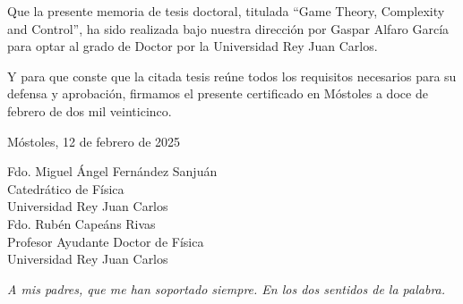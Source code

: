 \documentclass[a4paper,12pt,nofootinbib]{newsiambook}
\newcommand{\clearemptydoublepage}{\newpage{\pagestyle{empty}\cleardoublepage}}
\newcommand{\dedica}{\sffamily \slshape}
\begin{document}
Que la presente memoria de tesis doctoral, titulada “Game Theory, Complexity and Control”, ha sido realizada bajo nuestra dirección por Gaspar Alfaro García para optar al grado de Doctor por la Universidad Rey Juan Carlos. 

Y para que conste que la citada tesis reúne todos los requisitos necesarios para su defensa y aprobación, firmamos el presente certificado en Móstoles a doce de febrero de dos mil veinticinco.

\vspace*{1cm}

\raggedleft
Móstoles, 12 de febrero de 2025

\centering


\vspace*{3.5cm}


\begin{multicols}{2}
Fdo. Miguel Ángel Fernández Sanjuán \\ Catedrático de Física \\ Universidad Rey Juan Carlos\\ 
\columnbreak
Fdo. Rubén Capeáns Rivas \\ Profesor Ayudante Doctor de Física \\ Universidad Rey Juan Carlos
\end{multicols}



\justifying

\clearemptydoublepage

\thispagestyle{empty}

\begin{flushright}

\begin{minipage}[t][5cm][b]{0,5\textwidth}

{\dedica \large A mis padres, que me han soportado siempre. En los dos sentidos de la palabra.}

\end{minipage}
\end{flushright}

\clearemptydoublepage



 


\clearemptydoublepage



\setcounter{chapter}{0}


\end{document}
